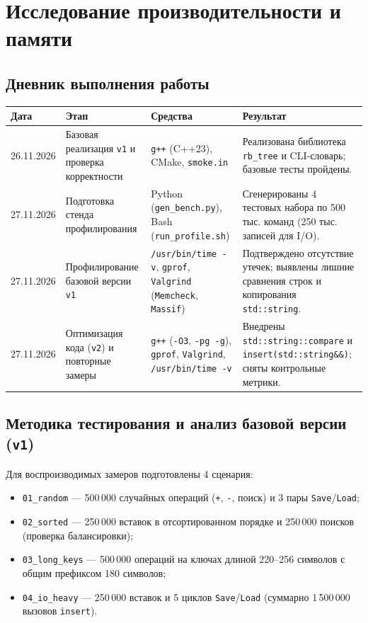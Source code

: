 \section{Исследование производительности и памяти}

\subsection{Дневник выполнения работы}

\begin{longtable}{|p{2.0cm}|p{3.6cm}|p{3.6cm}|p{5.0cm}|}
\hline
\rowcolor{lightgray}
\textbf{Дата} & \textbf{Этап} & \textbf{Средства} & \textbf{Результат} \\
\hline
26.11.2026 & Базовая реализация \texttt{v1} и проверка корректности & \texttt{g++} (C++23), CMake, \texttt{smoke.in} & Реализована библиотека \texttt{rb\_tree} и CLI-словарь; базовые тесты пройдены. \\
\hline
27.11.2026 & Подготовка стенда профилирования & Python (\texttt{gen\_bench.py}), Bash (\texttt{run\_profile.sh}) & Сгенерированы 4 тестовых набора по 500 тыс. команд (250 тыс. записей для I/O). \\
\hline
27.11.2026 & Профилирование базовой версии \texttt{v1} & \texttt{/usr/bin/time -v}, \texttt{gprof}, \texttt{Valgrind} (\texttt{Memcheck}, \texttt{Massif}) & Подтверждено отсутствие утечек; выявлены лишние сравнения строк и копирования \texttt{std::string}. \\
\hline
27.11.2026 & Оптимизация кода (\texttt{v2}) и повторные замеры & \texttt{g++} (\texttt{-O3}, \texttt{-pg -g}), \texttt{gprof}, \texttt{Valgrind}, \texttt{/usr/bin/time -v} & Внедрены \texttt{std::string::compare} и \texttt{insert(std::string\&\&)}; сняты контрольные метрики. \\
\hline
\end{longtable}

\subsection{Методика тестирования и анализ базовой версии (\texttt{v1})}
Для воспроизводимых замеров подготовлены 4 сценария:
\begin{itemize}
    \item \texttt{01\_random} --- 500\,000 случайных операций (\texttt{+}, \texttt{-}, поиск) и 3 пары \texttt{Save}/\texttt{Load};
    \item \texttt{02\_sorted} --- 250\,000 вставок в отсортированном порядке и 250\,000 поисков (проверка балансировки);
    \item \texttt{03\_long\_keys} --- 500\,000 операций на ключах длиной 220--256 символов с общим префиксом 180 символов;
    \item \texttt{04\_io\_heavy} --- 250\,000 вставок и 5 циклов \texttt{Save}/\texttt{Load} (суммарно 1\,500\,000 вызовов \texttt{insert}).
\end{itemize}

